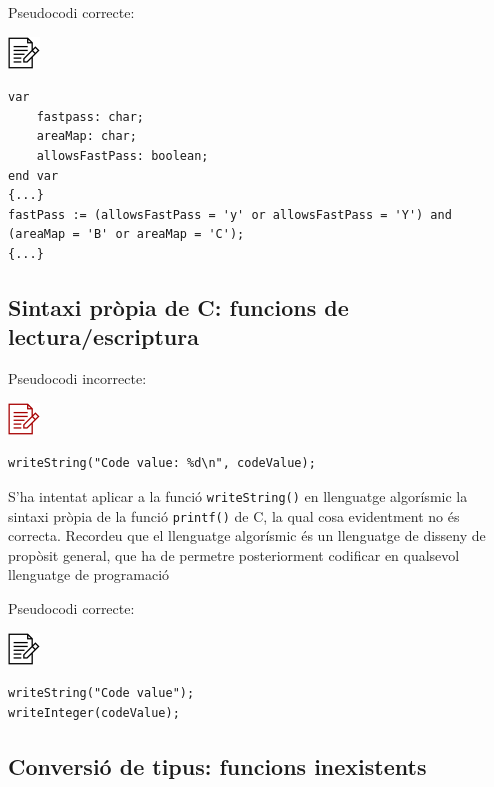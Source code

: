 \documentclass[
]{book}
\begin{document}
Pseudocodi correcte:

\includegraphics{./img/alg.png}

\begin{verbatim}
var
    fastpass: char;
    areaMap: char;
    allowsFastPass: boolean;
end var
{...}
fastPass := (allowsFastPass = 'y' or allowsFastPass = 'Y') and (areaMap = 'B' or areaMap = 'C');
{...}
\end{verbatim}

\hypertarget{sintaxi-pruxf2pia-de-c-funcions-de-lecturaescriptura}{%
\subsection{Sintaxi pròpia de C: funcions de lectura/escriptura}\label{sintaxi-pruxf2pia-de-c-funcions-de-lecturaescriptura}}

Pseudocodi incorrecte:

\includegraphics{./img/alg_err.png}

\begin{verbatim}
writeString("Code value: %d\n", codeValue);
\end{verbatim}

S'ha intentat aplicar a la funció \texttt{writeString()} en llenguatge algorísmic la sintaxi pròpia de la funció \texttt{printf()} de C, la qual cosa evidentment no és correcta. Recordeu que el llenguatge algorísmic és un llenguatge de disseny de propòsit general, que ha de permetre posteriorment codificar en qualsevol llenguatge de programació

Pseudocodi correcte:

\includegraphics{./img/alg.png}

\begin{verbatim}
writeString("Code value");
writeInteger(codeValue);
\end{verbatim}

\hypertarget{conversiuxf3-de-tipus-funcions-inexistents}{%
\subsection{Conversió de tipus: funcions inexistents}\label{conversiuxf3-de-tipus-funcions-inexistents}}
\end{document}
